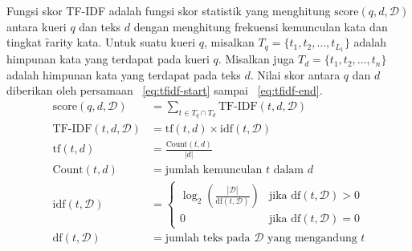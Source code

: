     Fungsi skor TF-IDF adalah fungsi skor statistik yang menghitung $\text{score}(q,d,\mathcal{D})$ antara kueri $q$ dan teks $d$ dengan menghitung frekuensi kemunculan kata dan tingkat \f{rarity} kata. Untuk suatu kueri $q$, misalkan $T_q= \{t_1, t_2, \dots, t_{L_1}\}$ adalah himpunan kata yang terdapat pada kueri $q$. Misalkan juga $T_d = \{t_1, t_2, \dots, t_n\}$ adalah himpunan kata yang terdapat pada teks $d$. Nilai skor antara $q$ dan $d$ diberikan oleh persamaan \equ~\ref{eq:tfidf-start} sampai \equ~\ref{eq:tfidf-end}.
    \begin{align}
        \label{eq:tfidf-start}
        \text{score}(q,d,\mathcal{D}) &= \sum_{t \in T_q \cap T_d} \text{TF-IDF}(t, d, \mathcal{D}) \\
        \label{eq:tf-idf-weight}
        \text{TF-IDF}(t, d, \mathcal{D}) &= \text{tf}(t, d) \times \text{idf}(t, \mathcal{D}) \\
        \text{tf}(t, d) &= \frac{\text{Count}(t, d)}{|d|} \\
        \text{Count}(t, d) &= \text{jumlah kemunculan } t \text{ dalam } d \\
        \text{idf}(t, \mathcal{D}) &= \begin{cases}
            \log_2\left(\frac{|\mathcal{D}|}{\text{df}(t, \mathcal{D})}\right) & \text{jika } \text{df}(t, \mathcal{D}) > 0 \\
            0 & \text{jika } \text{df}(t, \mathcal{D}) = 0
        \end{cases} \\
        \text{df}(t, \mathcal{D}) &= \text{jumlah teks pada } \mathcal{D} \text{ yang mengandung } t
        \label{eq:tfidf-end}
    \end{align}

